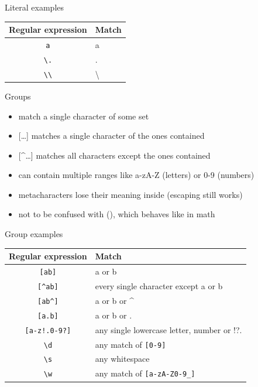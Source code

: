 \documentclass[10pt, graphics, aspectratio=169, table]{beamer}
\begin{document}
    \begin{frame}[fragile]{Literal examples}
        \begin{center}
            \begin{tabular}{cl}
                \toprule
                Regular expression & Match \\
                \midrule
                \verb|a| & a \\
                \verb|\.| & . \\
                \verb|\\| & \textbackslash \\
                \bottomrule
            \end{tabular}
        \end{center}
    \end{frame}

    \begin{frame}{Groups}
        \begin{itemize}
            \item match a single character of some set
            \item {[\ldots]} matches a single character of the ones contained
            \item {[\textasciicircum\ldots]} matches all characters except the ones contained
            \item can contain multiple ranges like a-zA-Z (letters) or 0-9 (numbers)
            \item metacharacters lose their meaning inside (escaping still works)
            \item not to be confused with (), which behaves like in math
        \end{itemize}
    \end{frame}

    \begin{frame}[fragile]{Group examples}
        \begin{center}
            \begin{tabular}{cl}
                \toprule
                Regular expression & Match \\
                \midrule
                \verb|[ab]| & a or b \\
                \verb|[^ab]| & every single character except a or b \\
                \verb|[ab^]| & a or b or \textasciicircum \\
                \verb|[a.b]| & a or b or . \\
                \verb|[a-z!.0-9?]| & any single lowercase letter, number or !?. \\
                \verb|\d| & any match of \verb|[0-9]| \\
                \verb|\s| & any whitespace \\
                \verb|\w| & any match of \verb|[a-zA-Z0-9_]| \\
                \bottomrule
            \end{tabular}
        \end{center}
    \end{frame}
\end{document}
